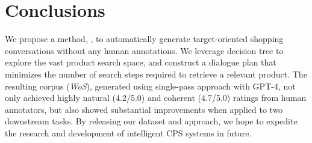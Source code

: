 \section{Conclusions}
We propose a method, \method, to automatically generate target-oriented shopping conversations without any human annotations. 
We leverage decision tree to explore the vast product search space, and construct a dialogue plan that minimizes the number of search steps required to retrieve a relevant product.
The resulting corpus (\textit{WoS}), generated using single-pass approach with GPT-4, not only achieved highly natural (4.2/5.0) and coherent (4.7/5.0) ratings from human annotators, but also showed substantial improvements when applied to two downstream tasks. By releasing our dataset and approach, we hope to expedite the research and development of intelligent CPS systems in future.



